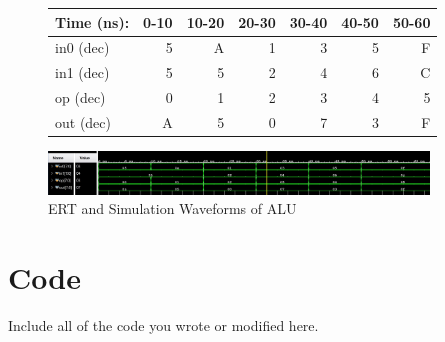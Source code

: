 \documentclass[11pt]{article}
\begin{document}
\begin{figure}[ht]\centering
	\begin{tabular}{l|rrrrrr}
		Time (ns): & 0-10 & 10-20 & 20-30 & 30-40 & 40-50 & 50-60  \\
		\midrule
		in0 (dec) & 5 & A & 1 & 3 & 5 & F \\
		in1 (dec) & 5 & 5 & 2 & 4 & 6 & C \\
		op (dec) & 0 & 1 & 2 & 3 & 4 & 5 \\
		\midrule 
		out (dec) & A & 5 & 0 & 7 & 3 & F \\
		\bottomrule
	\end{tabular}\medskip
	
		\includegraphics[width=0.9\textwidth]{ALU_test.JPG}
		\caption{ERT and Simulation Waveforms of ALU}
		\label{fig:sim_with_table}
\end{figure}


\clearpage
\section*{Code}

Include all of the code you wrote or modified here.
\end{document}
